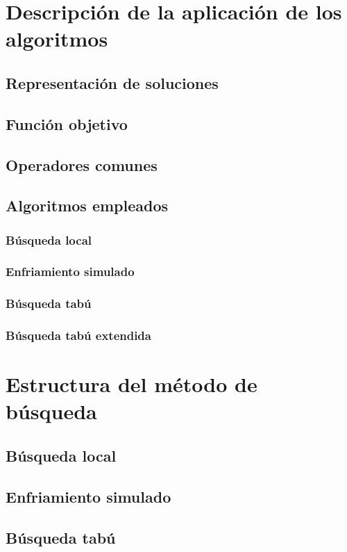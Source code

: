\documentclass[11pt,leqno]{article}
\begin{document}
\section{Descripción de la aplicación de los algoritmos}

\subsection{Representación de soluciones}
\subsection{Función objetivo}
\subsection{Operadores comunes}
\subsection{Algoritmos empleados}
\subsubsection{Búsqueda local}
\subsubsection{Enfriamiento simulado}
\subsubsection{Búsqueda tabú}
\subsubsection{Búsqueda tabú extendida}

\section{Estructura del método de búsqueda}
\subsection{Búsqueda local}
\subsection{Enfriamiento simulado}
\subsection{Búsqueda tabú}
\end{document}
